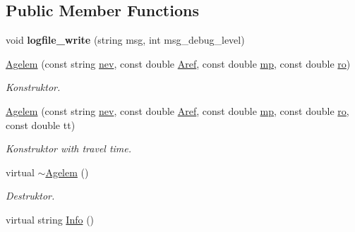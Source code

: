 \subsection*{Public Member Functions}
\begin{DoxyCompactItemize}
\item 
void {\bfseries logfile\+\_\+write} (string msg, int msg\+\_\+debug\+\_\+level)\hypertarget{class_agelem_a9dd12f555cf1927a743f2672a1545c61}{}\label{class_agelem_a9dd12f555cf1927a743f2672a1545c61}

\item 
\hyperlink{class_agelem_a72fb0a2a58cfbcbcce00aa09ba40d8a0}{Agelem} (const string \hyperlink{class_agelem_abe92b7e3912367d5d1caf6b277ca0b7d}{nev}, const double \hyperlink{class_agelem_a3f8668febc2958fd539997d537552f17}{Aref}, const double \hyperlink{class_agelem_a1377d80d8511cc4adacccba31d28282d}{mp}, const double \hyperlink{class_agelem_a520072191e53f368a04ca80b8b583a3f}{ro})\hypertarget{class_agelem_a72fb0a2a58cfbcbcce00aa09ba40d8a0}{}\label{class_agelem_a72fb0a2a58cfbcbcce00aa09ba40d8a0}

\begin{DoxyCompactList}\small\item\em Konstruktor. \end{DoxyCompactList}\item 
\hyperlink{class_agelem_ad8c13af2ccc41f2b68a693518c1e850e}{Agelem} (const string \hyperlink{class_agelem_abe92b7e3912367d5d1caf6b277ca0b7d}{nev}, const double \hyperlink{class_agelem_a3f8668febc2958fd539997d537552f17}{Aref}, const double \hyperlink{class_agelem_a1377d80d8511cc4adacccba31d28282d}{mp}, const double \hyperlink{class_agelem_a520072191e53f368a04ca80b8b583a3f}{ro}, const double tt)\hypertarget{class_agelem_ad8c13af2ccc41f2b68a693518c1e850e}{}\label{class_agelem_ad8c13af2ccc41f2b68a693518c1e850e}

\begin{DoxyCompactList}\small\item\em Konstruktor with travel time. \end{DoxyCompactList}\item 
virtual \hyperlink{class_agelem_a62ea4415f524e75918a2dde15e8bd560}{$\sim$\+Agelem} ()\hypertarget{class_agelem_a62ea4415f524e75918a2dde15e8bd560}{}\label{class_agelem_a62ea4415f524e75918a2dde15e8bd560}

\begin{DoxyCompactList}\small\item\em Destruktor. \end{DoxyCompactList}\item 
virtual string \hyperlink{class_agelem_a2e6c4688cdbdf17c6d3bde0c6c08ff49}{Info} ()\hypertarget{class_agelem_a2e6c4688cdbdf17c6d3bde0c6c08ff49}{}\label{class_agelem_a2e6c4688cdbdf17c6d3bde0c6c08ff49}


\end{DoxyCompactItemize}
